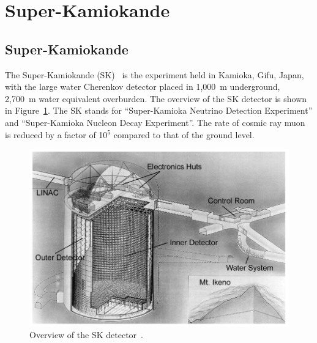 
%
%

\section{Super-Kamiokande}\label{Section_SK}





\subsection{Super-Kamiokande}
\vs\hs
The Super-Kamiokande (SK)~\cite{2003Fukuda} is the experiment held in Kamioka, Gifu, Japan, with the large water Cherenkov detector placed in 1,000~m underground, 2,700~m water equivalent overburden.
The overview of the SK detector is shown in Figure~\ref{SK_SK}.
The SK stands for ``Super-Kamioka Neutrino Detection Experiment'' and ``Super-Kamioka Nucleon Decay Experiment''.
The rate of cosmic ray muon is reduced by a factor of 10$^{\text{5}}$ compared to that of the ground level.

\begin{figure}[H]
	\centering
	\includegraphics[width=14cm]{Figures/SK/SK}
	\caption[Overview of the Super-Kamiokande detector]{
	Overview of the SK detector~\cite{2003Fukuda}.
	}\label{SK_SK}
\end{figure}

